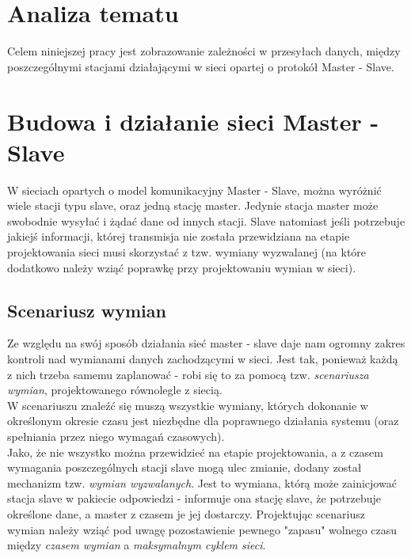 \section{Analiza tematu}
Celem niniejszej pracy jest zobrazowanie zależności w przesyłach danych, między poszczególnymi stacjami działającymi w sieci opartej o protokół Master - Slave.

\section{Budowa i działanie sieci Master - Slave}
W sieciach opartych o model komunikacyjny Master - Slave, można wyróżnić wiele stacji typu slave, oraz jedną stację master. Jedynie stacja master może swobodnie wysyłać i żądać dane od innych stacji. Slave natomiast jeśli potrzebuje jakiejś informacji, której transmisja nie została przewidziana na etapie projektowania sieci musi skorzystać z tzw. wymiany wyzwalanej (na które dodatkowo należy wziąć poprawkę przy projektowaniu wymian w sieci).

	\subsection{Scenariusz wymian}
	Ze względu na swój sposób działania sieć master - slave daje nam ogromny zakres kontroli nad wymianami danych zachodzącymi w sieci. Jest tak, ponieważ każdą z nich trzeba samemu zaplanować - robi się to za pomocą tzw. \textit{scenariusza wymian}, projektowanego równolegle z siecią.\\
	W scenariuszu znaleźć się muszą wszystkie wymiany, których dokonanie w określonym okresie czasu jest niezbędne dla poprawnego działania systemu (oraz spełniania przez niego wymagań czasowych).\\
	Jako, że nie wszystko można przewidzieć na etapie projektowania, a z czasem wymagania poszczególnych stacji slave mogą ulec zmianie, dodany został mechanizm tzw. \textit{wymian wyzwalanych}. Jest to wymiana, którą może zainicjować stacja slave w pakiecie odpowiedzi - informuje ona stację slave, że potrzebuje określone dane, a master z czasem je jej dostarczy. Projektując scenariusz wymian należy wziąć pod uwagę pozostawienie pewnego "zapasu" wolnego czasu między \textit{czasem wymian} a \textit{maksymalnym cyklem sieci}.